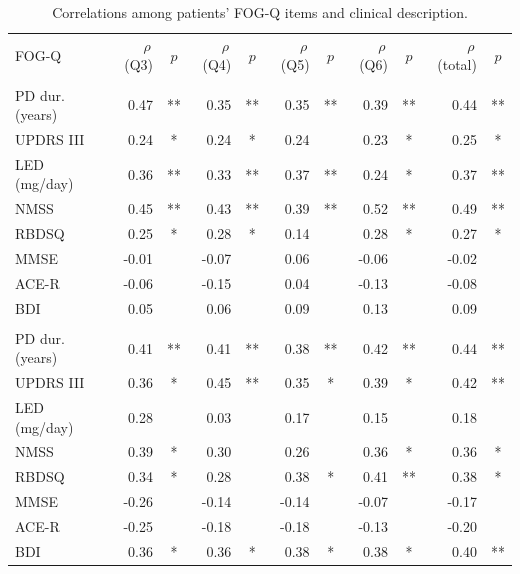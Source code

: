 \begin{table}[htb!]
	\centering
	\begin{threeparttable}
		\caption{Correlations among patients' FOG-Q items and clinical description.}
		\label{tab:ch6_classical_correlations}
		\footnotesize
		\centering
		\begin{tabular}{l r c r c r c r c r c}

			\hline\hline\noalign{\smallskip}
			\rowcolor{gray_table}
			FOG-Q & $\rho$\,(Q3) & $p$ & $\rho$\,(Q4) & $p$ & $\rho$\,(Q5) & $p$ & $\rho$\,(Q6) & $p$ & $\rho$\,(total) & $p$ \\
			\noalign{\smallskip}
			\multicolumn{11}{c}{Session 1} \\
			\noalign{\smallskip}\hline\noalign{\smallskip}

			PD dur. (years)  &  0.47 & ** &  0.35 & ** &  0.35 & ** &  0.39 & ** &  0.44 & ** \\
			UPDRS III        &  0.24 & *  &  0.24 & *  &  0.24 &    &  0.23 & *  &  0.25 & *  \\
			LED (mg/day)     &  0.36 & ** &  0.33 & ** &  0.37 & ** &  0.24 & *  &  0.37 & ** \\
			NMSS             &  0.45 & ** &  0.43 & ** &  0.39 & ** &  0.52 & ** &  0.49 & ** \\
			RBDSQ            &  0.25 & *  &  0.28 & *  &  0.14 &    &  0.28 & *  &  0.27 & *  \\
			MMSE             & -0.01 &    & -0.07 &    &  0.06 &    & -0.06 &    & -0.02 &    \\
			ACE-R            & -0.06 &    & -0.15 &    &  0.04 &    & -0.13 &    & -0.08 &    \\
			BDI              &  0.05 &    &  0.06 &    &  0.09 &    &  0.13 &    &  0.09 &    \\

			\noalign{\smallskip}\hline\noalign{\smallskip}
			\multicolumn{11}{c}{Session 2} \\
			\noalign{\smallskip}\hline\noalign{\smallskip}

			PD dur. (years)  &  0.41 & ** &  0.41 & ** &  0.38 & ** &  0.42 & ** &  0.44 & ** \\
			UPDRS III        &  0.36 & *  &  0.45 & ** &  0.35 & *  &  0.39 & *  &  0.42 & ** \\
			LED (mg/day)     &  0.28 &    &  0.03 &    &  0.17 &    &  0.15 &    &  0.18 &    \\
			NMSS             &  0.39 & *  &  0.30 &    &  0.26 &    &  0.36 & *  &  0.36 & *  \\
			RBDSQ            &  0.34 & *  &  0.28 &    &  0.38 & *  &  0.41 & ** &  0.38 & *  \\
			MMSE             & -0.26 &    & -0.14 &    & -0.14 &    & -0.07 &    & -0.17 &    \\
			ACE-R            & -0.25 &    & -0.18 &    & -0.18 &    & -0.13 &    & -0.20 &    \\
			BDI              &  0.36 & *  &  0.36 & *  &  0.38 & *  &  0.38 & *  &  0.40 & ** \\


\end{tabular}
\end{threeparttable}
\end{table}
